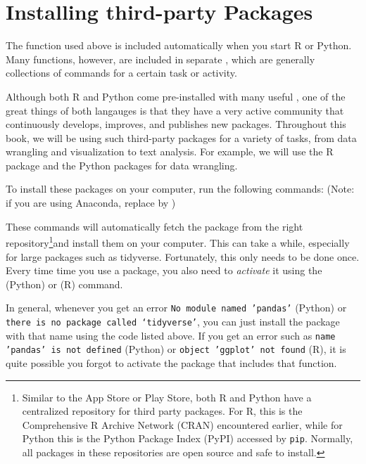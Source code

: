 \section{Installing third-party Packages}

The  function used above is included automatically when you start R or Python.
Many functions, however, are included in separate , which are
generally collections of commands for a certain task or activity.

Although both R and Python come pre-installed with many useful ,
one of the great things of both langauges is that they have a very active community that continuously develops, improves, and publishes new packages.
Throughout this book, we will be using such third-party packages for a variety of tasks, from data wrangling and visualization to text analysis.
For example, we will use the R package  and the Python packages  for data wrangling.

To install these packages on your computer, run the following commands:
(Note: if you are using Anaconda, replace  by )  

\begin{tcbraster}[raster columns=2,raster equal height=rows,raster valign=top]
\end{tcbraster}

\newcommand{\fnrepo}{\footnote{Similar to the App Store or Play Store, both R and Python have a centralized repository for third party packages.  For R, this is the Comprehensive R Archive Network (CRAN) encountered earlier,
    while for Python this is the Python Package Index (PyPI) accessed by \verb|pip|.  Normally, all packages in these repositories are open source and safe to install.}}

These commands will automatically fetch the package from the right repository\fnrepo and install them on your computer. This can take a while, especially for large packages such as tidyverse.
Fortunately, this only needs to be done once.
Every time time you use a package, you also need to \emph{activate} it using the  (Python) or   (R) command.

In general, whenever you get an error \texttt{No module named 'pandas'} (Python) or \texttt{there is no package called ‘tidyverse’},
you can just install the package with that name using the code listed above.
If you get an error such as \texttt{name 'pandas' is not defined} (Python) or \texttt{object 'ggplot' not found} (R),
it is quite possible you forgot to activate the package that includes that function. 


